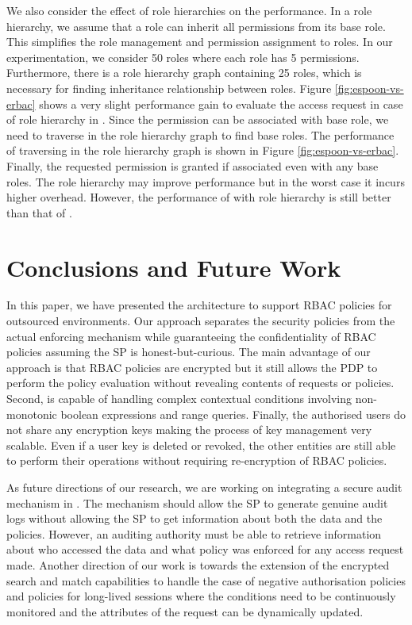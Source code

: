 \documentclass[final,5p,times,twocolumn]{elsarticle}
\begin{document}
We also consider the effect of role hierarchies on the  performance. In a role hierarchy, we assume that a role can inherit all permissions from its base role. This simplifies the role management and permission assignment to roles. In our experimentation, we consider 50 roles where each role has 5 permissions. Furthermore, there is a role hierarchy graph containing 25 roles, which is necessary for finding inheritance relationship between roles. Figure \ref{fig:espoon-vs-erbac} shows a very slight performance gain to evaluate the access request in case of role hierarchy in . Since the permission can be associated with base role, we need to traverse in the role hierarchy graph to find base roles. The performance of traversing in the role hierarchy graph is shown in Figure \ref{fig:espoon-vs-erbac}. Finally, the requested permission is granted if associated even with any base roles. The role hierarchy may improve performance but in the worst case it incurs higher overhead. However, the performance of  with role hierarchy is still better than that of .

\section{Conclusions and Future Work}
\label{sec:conclusions-future-work}
In this paper, we have presented the  architecture to support RBAC policies for outsourced environments. Our approach separates the security policies from the actual enforcing mechanism while guaranteeing the confidentiality of RBAC policies assuming the SP is honest-but-curious. The main advantage of our approach is that RBAC policies are encrypted but it still allows the PDP to perform the policy evaluation without revealing contents of requests or policies. Second,  is capable of handling complex contextual conditions involving non-monotonic boolean expressions and range queries. Finally, the authorised users do not share any encryption keys making the process of key management very scalable. Even if a user key is deleted or revoked, the other entities are still able to perform their operations without requiring re-encryption of RBAC policies.

As future directions of our research, we are working on integrating a secure audit mechanism in . The mechanism should allow the SP to generate genuine audit logs without allowing the SP to get information about both the data and the policies. However, an auditing authority must be able to retrieve information about who accessed the data and what policy was enforced for any access request made. Another direction of our work is towards the extension of the encrypted search and match capabilities to handle the case of negative authorisation policies and policies for long-lived sessions where the conditions need to be continuously monitored and the attributes of the request can be dynamically updated.
\end{document}
